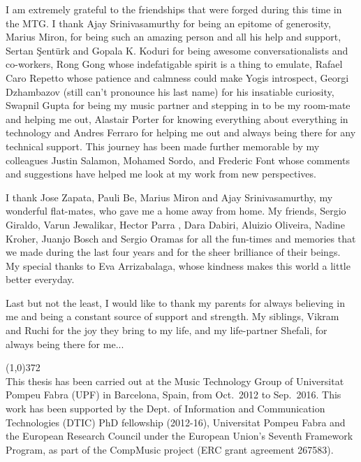 I am extremely grateful to the friendships that were forged during this time in the MTG. I thank Ajay Srinivasamurthy for being an epitome of generosity, Marius Miron, for being such an amazing person and all his help and support, Sertan \c{S}ent{\"u}rk and Gopala K. Koduri for being awesome conversationalists and co-workers, Rong Gong whose indefatigable spirit is a thing to emulate, Rafael Caro Repetto whose patience and calmness could make Yogis introspect, Georgi Dzhambazov (still can't pronounce his last name) for his insatiable curiosity, Swapnil Gupta for being my music partner and stepping in to be my room-mate and helping me out, Alastair Porter for knowing everything about everything in technology and Andres Ferraro for helping me out and always being there for any technical support. This journey has been made further memorable by my colleagues Justin Salamon, Mohamed Sordo, and Frederic Font whose comments and suggestions have helped me look at my work from new perspectives. 

I thank Jose Zapata, Pauli Be, Marius Miron and Ajay Srinivasamurthy, my wonderful flat-mates, who gave me a home away from home. My friends, Sergio Giraldo, Varun Jewalikar, Hector Parra , Dara Dabiri, Aluizio Oliveira, Nadine Kroher, Juanjo Bosch and Sergio Oramas for all the fun-times and memories that we made during the last four years and for the sheer brilliance of their beings. My special thanks to Eva Arrizabalaga, whose kindness makes this world a little better everyday.

Last but not the least, I would like to thank my parents for always believing in me and being a constant source of support and strength. My siblings, Vikram and Ruchi for the joy they bring to my life, and my life-partner Shefali, for always being there for me...



\vspace*{\fill}

\line(1,0){372}\\
\footnotesize
This thesis has been carried out at the Music Technology Group of Universitat Pompeu Fabra (UPF) in Barcelona, Spain, from Oct.~2012 to Sep.~2016. This work has been supported by the Dept. of Information and Communication Technologies (DTIC) PhD fellowship (2012-16), Universitat Pompeu Fabra and the European Research Council under the European Union’s Seventh Framework Program, as part of the CompMusic project (ERC grant agreement 267583).
\normalsize